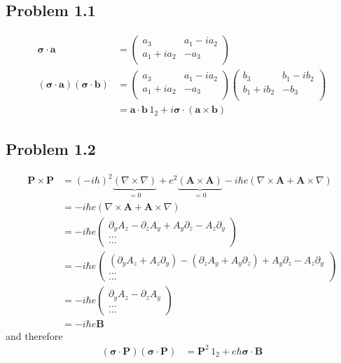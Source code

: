 \documentclass[../main.tex]{subfiles}
\begin{document}
\subsection{Problem 1.1}
\begin{align}
\mathbf{\sigma}\cdot\mathbf{a}&=
\left(\begin{matrix}
a_3 & a_1-ia_2\\
a_1+ia_2 & -a_3\\
\end{matrix}\right)\\
(\mathbf{\sigma}\cdot\mathbf{a})(\mathbf{\sigma}\cdot\mathbf{b})&=
\left(\begin{matrix}
a_3 & a_1-ia_2\\
a_1+ia_2 & -a_3\\
\end{matrix}\right)\left(\begin{matrix}
b_3 & b_1-ib_2\\
b_1+ib_2 & -b_3\\
\end{matrix}\right)\\
&=\mathbf{a}\cdot\mathbf{b}\,1_2+i\mathbf{\sigma}\cdot(\mathbf{a}\times\mathbf{b})
\end{align}

\subsection{Problem 1.2}
\begin{align}
\mathbf{P}\times\mathbf{P}
&=(-i\hbar)^2\underbrace{(\nabla\times\nabla)}_{=0}+e^2\underbrace{(\mathbf{A}\times\mathbf{A})}_{=0}-i\hbar e(\nabla\times\mathbf{A}+\mathbf{A}\times\nabla)\\
&=-i\hbar e(\nabla\times\mathbf{A}+\mathbf{A}\times\nabla)\\
&=-i\hbar e\left(\begin{matrix}
\partial_yA_z-\partial_zA_y+A_y\partial_z-A_z\partial_y\\
...\\
...
\end{matrix}\right)\\
&=-i\hbar e\left(\begin{matrix}
(\partial_yA_z+A_z\partial_y)-(\partial_zA_y+A_y\partial_z)+A_y\partial_z-A_z\partial_y\\
...\\
...
\end{matrix}\right)\\
&=-i\hbar e\left(\begin{matrix}
\partial_yA_z-\partial_zA_y\\
...\\
...
\end{matrix}\right)\\
&=-i\hbar e\mathbf{B}
\end{align}
and therefore
\begin{align}
(\mathbf{\sigma}\cdot\mathbf{P})(\mathbf{\sigma}\cdot\mathbf{P})
&=\mathbf{P}^2\,1_2+e\hbar\mathbf{\sigma}\cdot\mathbf{B}
\end{align}
\end{document}
